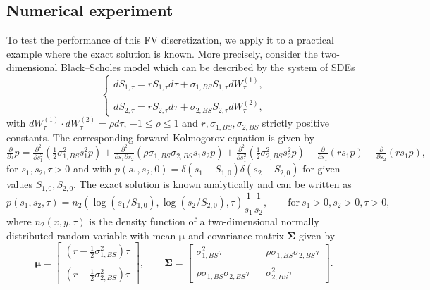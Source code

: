 \documentclass[10pt]{article}
\begin{document}
\subsection{Numerical experiment}

To test the performance of this FV discretization, we apply it to a practical example where the exact solution is known. More precisely, consider the two-dimensional Black--Scholes model which can be described by the system of SDEs
\begin{equation}
\left\{ \begin{array}{l}
dS_{1,\tau} = r S_{1,\tau} d\tau + \sigma_{1,BS} S_{1,\tau} dW^{(1)}_{\tau}, \\\\
dS_{2,\tau} = r S_{2,\tau} d\tau + \sigma_{2,BS} S_{2,\tau} dW^{(2)}_{\tau},
\end{array} \right.
\end{equation}
with $dW^{(1)}_{\tau} \cdot dW^{(2)}_{\tau} = \rho d\tau$, $-1 \le \rho \le 1$ and $r, \sigma_{1,BS},\sigma_{2,BS}$ strictly positive constants. The corresponding forward Kolmogorov equation is given by
\begin{equation}
\tfrac{\partial}{\partial \tau} p = \tfrac{\partial^{2}}{\partial s_{1}^{2}} \left( \tfrac{1}{2} \sigma_{1,BS}^{2}s_{1}^{2}p \right) + \tfrac{\partial^{2}}{\partial s_{1} \partial s_{2}} \left( \rho \sigma_{1,BS} \sigma_{2,BS} s_{1} s_{2} p \right) + \tfrac{\partial^{2}}{\partial s_{1}^{2}} \left( \tfrac{1}{2} \sigma_{2,BS}^{2} s_{2}^{2} p \right) - \tfrac{\partial}{\partial s_{1}} \left( r s_{1} p \right) - \tfrac{\partial}{\partial s_{2}} \left( r s_{1} p \right),
\end{equation}
for $s_{1}, s_{2}, \tau > 0$ and with $p(s_{1},s_{2},0)=\delta(s_{1}-S_{1,0})\delta(s_{2}-S_{2,0})$ for given values $S_{1,0}, S_{2,0}$.
The exact solution is known analytically and can be written as
\begin{equation}
p(s_{1},s_{2},\tau) = n_{2}(\log(s_{1}/S_{1,0}),\log(s_{2}/S_{2,0}),\tau)\frac{1}{s_{1}}\frac{1}{s_{2}}, \qquad \mathrm{for} \ s_{1}>0, s_{2}>0, \tau > 0,
\end{equation}
where $n_{2}(x,y,\tau)$ is the density function of a two-dimensional normally distributed random variable with mean $\boldsymbol{\mu}$ and covariance matrix $\boldsymbol{\Sigma}$ given by
$$ \boldsymbol{\mu} = \left[ \begin{array}{c}
(r - \tfrac{1}{2} \sigma^{2}_{1,BS})\tau \\\\ (r - \tfrac{1}{2} \sigma^{2}_{2,BS})\tau
\end{array} \right], \qquad
\boldsymbol{\Sigma} = \left[ \begin{array}{ccc}
\sigma^{2}_{1,BS}\tau && \rho \sigma_{1,BS}\sigma_{2,BS}\tau  \\\\
\rho \sigma_{1,BS}\sigma_{2,BS}\tau && \sigma^{2}_{2,BS}\tau
\end{array} \right]. $$
\end{document}
